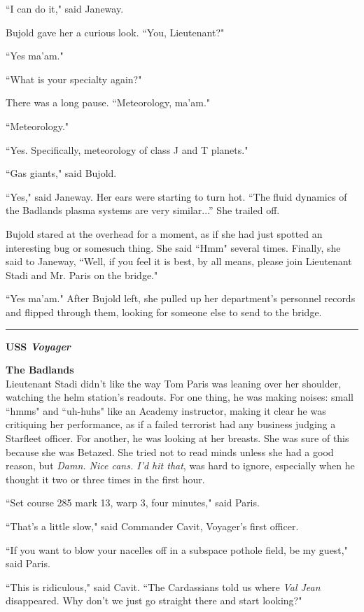 \documentclass[twoside,letterpaper,12pt]{memoir}
\begin{document}
``I can do it," said Janeway.

Bujold gave her a curious look. ``You, Lieutenant?"

``Yes ma'am."

``What is your specialty again?"

There was a long pause. ``Meteorology, ma'am."

``Meteorology."

``Yes. Specifically, meteorology of class J and T planets."

``Gas giants," said Bujold.

``Yes," said Janeway. Her ears were starting to turn hot. ``The fluid dynamics of the Badlands plasma systems are very similar...'' She trailed off.

Bujold stared at the overhead for a moment, as if she had just spotted an interesting bug or somesuch thing. She said ``Hmm" several times. Finally, she said to Janeway, ``Well, if you feel it is best, by all means, please join Lieutenant Stadi and Mr. Paris on the bridge."

``Yes ma'am." After Bujold left, she pulled up her department's personnel records and flipped through them, looking for someone else to send to the bridge.

\fancybreak{\rule{3cm}{0.4 pt}}
\noindent\textbf{USS \textit{Voyager}}

\noindent\textbf{The Badlands}\\

Lieutenant Stadi didn't like the way Tom Paris was leaning over her shoulder, watching the helm station's readouts. For one thing, he was making noises: small ``hmms" and ``uh-huhs" like an Academy instructor, making it clear he was critiquing her performance, as if a failed terrorist had any business judging a Starfleet officer. For another, he was looking at her breasts. She was sure of this because she was Betazed. She tried not to read minds unless she had a good reason, but \textit{Damn. Nice cans. I'd hit that}, was hard to ignore, especially when he thought it two or three times in the first hour.

``Set course 285 mark 13, warp 3, four minutes," said Paris.

``That's a little slow," said Commander Cavit, Voyager's first officer.

``If you want to blow your nacelles off in a subspace pothole field, be my guest," said Paris.

``This is ridiculous," said Cavit. ``The Cardassians told us where \textit{Val Jean} disappeared. Why don't we just go straight there and start looking?"
\end{document}
